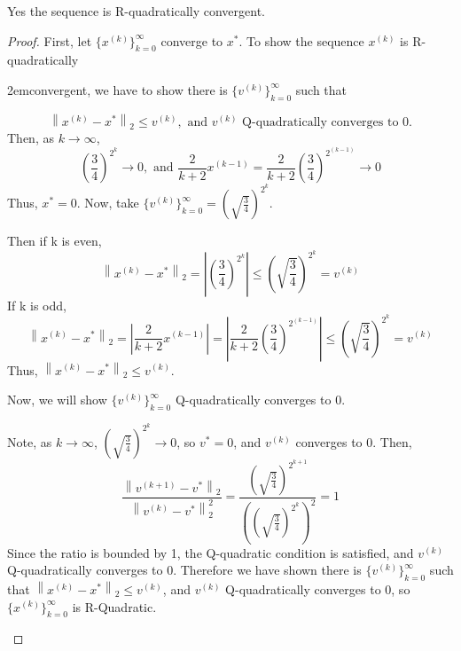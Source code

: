 \documentclass[12pt]{article}
\begin{document}
\vspace{8mm}

\noindent Yes the sequence is R-quadratically convergent.

\vspace{4mm}


\begin{proof}First, let $\{x^{(k)}\}_{k=0}^\infty$ converge to $x^*$. To show the sequence $x^{(k)}$ is R-quadratically \begin{adjustwidth}{2em}{}convergent, we have to show there is $\{v^{(k)}\}_{k=0}^\infty$ such that

\[ \left\|x^{(k)} - x^*\right\|_2 \leq v^{(k)}, \text{ and }v^{(k)} \text{ Q-quadratically converges to 0.}\]
Then, as $k \rightarrow \infty$,
\[\left(\frac{3}{4}\right)^{2^k} \rightarrow 0, \text{ and } \frac{2}{k + 2}x^{(k - 1)} = \frac{2}{k + 2}\left(\frac{3}{4}\right)^{2^{(k-1)}} \rightarrow 0 \]
Thus, $x^* = 0$.
Now, take $\{v^{(k)}\}_{k=0}^\infty = \left(\sqrt{\frac{3}{4}}\right)^{2^k}$.

\noindent Then if k is even,
\[ \left\|x^{(k)} - x^*\right\|_2 = \left|\left(\frac{3}{4}\right)^{2^k}\right| \leq \left(\sqrt{\frac{3}{4}}\right)^{2^k} = v^{(k)}\]
If k is odd,
\[ \left\|x^{(k)} - x^*\right\|_2 = \left|\frac{2}{k + 2}x^{(k - 1)}\right| = \left|\frac{2}{k + 2}\left(\frac{3}{4}\right)^{2^{(k - 1)}}\right| \leq \left(\sqrt{\frac{3}{4}}\right)^{2^k} = v^{(k)}\]
Thus, $\left\|x^{(k)} - x^*\right\|_2 \leq v^{(k)}$.

\noindent Now, we will show $\{v^{(k)}\}_{k=0}^\infty$ Q-quadratically converges to 0.

\noindent Note, as $k \rightarrow \infty$, $\left(\sqrt{\frac{3}{4}}\right)^{2^k} \rightarrow 0$, so $v^* = 0$, and $v^{(k)}$ converges to 0.
Then,
\[ \frac{\left\|v^{(k + 1)} - v^*\right\|_2}{\left\|v^{(k)} - v^*\right\|^2_2} = \frac{\left(\sqrt{\frac{3}{4}}\right)^{2^{k + 1}}}{\left(\left(\sqrt{\frac{3}{4}}\right)^{2^k}\right)^2} = 1\]
Since the ratio is bounded by 1, the Q-quadratic condition is satisfied, and $v^{(k)}$ Q-quadratically converges to 0.
\noindent Therefore we have shown there is $\{v^{(k)}\}_{k=0}^\infty$ such that $\left\|x^{(k)} - x^*\right\|_2 \leq v^{(k)}$, and $v^{(k)}$ Q-quadratically converges to 0, so $\{x^{(k)}\}_{k=0}^\infty$ is R-Quadratic.

\end{adjustwidth}

\end{proof}
\end{document}

